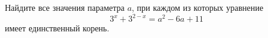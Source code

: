 \begin{ex}
	\begin{condition}
		Найдите все значения параметра \( a \), при каждом из которых уравнение \[ 3^x+3^{2-x}=a^2-6a+11 \] имеет единственный корень.
	\end{condition}
\end{ex}